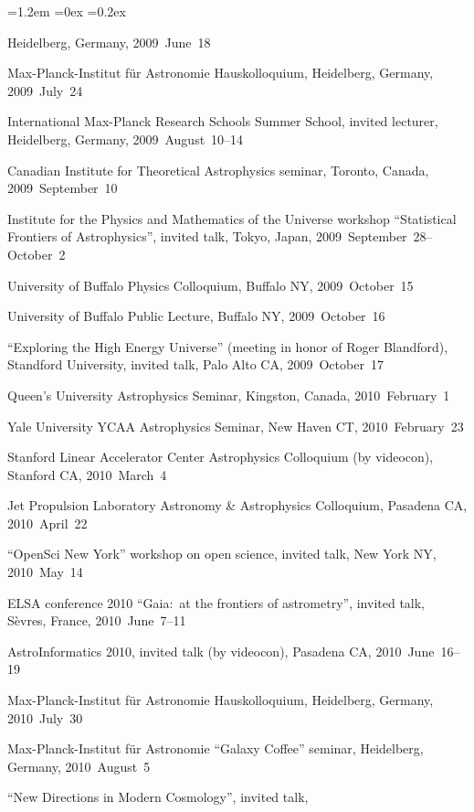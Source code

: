 \documentclass[10pt,letterpaper]{article}
\newcounter{refpubnum}
\newcommand{\hogglist}{%
    \rightmargin=0in
    \leftmargin=1.2em
    \topsep=0ex
    \partopsep=0pt
    \itemsep=0.2ex
    \parsep=0pt
    \itemindent=-1.0\leftmargin
    \listparindent=0.0\leftmargin
    \settowidth{\labelsep}{~}
    \usecounter{refpubnum}
  }
\begin{document}
\begin{list}{}{\hogglist}
{          Heidelberg, Germany, 2009~June~18
\item Max-Planck-Institut f\"ur Astronomie Hauskolloquium,
          Heidelberg, Germany, 2009~July~24
\item International Max-Planck Research Schools Summer School,
          invited lecturer,
          Heidelberg, Germany, 2009~August~10--14
\item Canadian Institute for Theoretical Astrophysics seminar,
          Toronto, Canada, 2009~September~10
\item Institute for the Physics and Mathematics of the Universe workshop
          ``Statistical Frontiers of Astrophysics'', invited talk,
          Tokyo, Japan, 2009~September~28--October~2
\item University of Buffalo Physics Colloquium,
          Buffalo NY, 2009~October~15
\item University of Buffalo Public Lecture,
          Buffalo NY, 2009~October~16
\item ``Exploring the High Energy Universe'' (meeting in honor of
          Roger Blandford), Standford University, invited talk,
          Palo Alto CA, 2009~October~17
\item Queen's University Astrophysics Seminar,
          Kingston, Canada, 2010~February~1
\item Yale University YCAA Astrophysics Seminar,
          New Haven CT, 2010~February~23
\item Stanford Linear Accelerator Center Astrophysics Colloquium (by videocon),
          Stanford CA, 2010~March~4
\item Jet Propulsion Laboratory Astronomy \& Astrophysics Colloquium,
          Pasadena CA, 2010~April~22
\item ``OpenSci New York'' workshop on open science, invited talk,
          New York NY, 2010~May~14
\item ELSA conference 2010 ``Gaia:\ at the frontiers of astrometry'',
          invited talk, S\`evres, France, 2010~June~7--11
\item AstroInformatics 2010, invited talk (by videocon),
          Pasadena CA, 2010~June~16--19
\item Max-Planck-Institut f\"ur Astronomie Hauskolloquium,
          Heidelberg, Germany, 2010~July~30
\item Max-Planck-Institut f\"ur Astronomie ``Galaxy Coffee'' seminar,
          Heidelberg, Germany, 2010~August~5
\item ``New Directions in Modern Cosmology'', invited talk,
}
\end{list}
\end{document}

